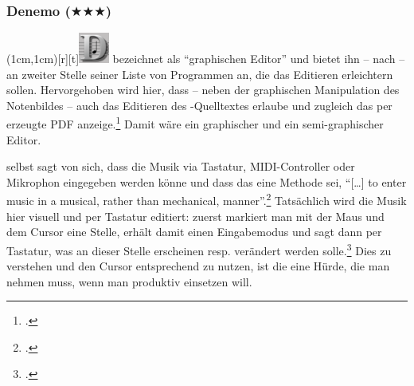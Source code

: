 %
%
%



\subsubsection{Denemo ($\bigstar\bigstar\bigstar$)}

\parpic(1cm,1cm)[r][t]{\includegraphics[width=1cm]{logos/denemo-300dpi.png}}
\label{Denemo} bezeichnet  als \enquote{graphischen
Editor} und bietet ihn -- nach  -- an zweiter Stelle seiner
Liste von Programmen an, die das Editieren erleichtern sollen. Hervorgehoben
wird hier, dass  -- neben der graphischen Manipulation des
Notenbildes -- auch das Editieren des -Quelltextes erlaube und
zugleich das per  erzeugte PDF anzeige.\footcite[vgl.][\nopage
wp]{LilyPond2018g} Damit wäre  ein graphischer und ein
semi-graphischer Editor.

 selbst sagt von sich, dass die Musik via Tastatur, MIDI-Controller
oder Mikrophon eingegeben werden könne und dass das eine Methode sei,
\enquote{[\ldots] to enter music in a musical, rather than mechanical,
manner}.\footcite[vgl.][\nopage wp]{Denemo2019b} Tatsächlich wird die Musik hier
visuell und per Tastatur editiert: zuerst markiert man mit der Maus und dem
Cursor eine Stelle, erhält damit einen Eingabemodus und sagt dann per Tastatur,
was an dieser Stelle erscheinen resp. verändert werden solle.\footcite[vgl.][1,
5, u. 47ff]{Shann2015b} Dies zu verstehen und den Cursor entsprechend zu nutzen,
ist die eine Hürde, die man nehmen muss, wenn man  produktiv
einsetzen will.

